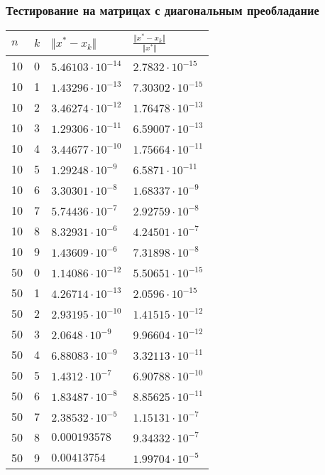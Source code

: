 \documentclass[english]{article}
\begin{document}
\subsubsection{Тестирование на матрицах с диагональным преобладание}
\begin{center}
  \begin{longtable}{l|l|l|l}
    \(n\) & \(k\) & \(\Vert x^* - x_k \Vert\) & \(\frac{\Vert x^* - x_k \Vert}{\Vert x^* \Vert}\) \\
    \hline
    10 & 0 & \(5.46103\cdot 10^{-14} \)& \(2.7832\cdot 10^{-15}\) \\
    10 & 1 & \(1.43296\cdot 10^{-13} \)& \(7.30302\cdot 10^{-15}\) \\
    10 & 2 & \(3.46274\cdot 10^{-12} \)& \(1.76478\cdot 10^{-13}\) \\
    10 & 3 & \(1.29306\cdot 10^{-11} \)& \(6.59007\cdot 10^{-13}\) \\
    10 & 4 & \(3.44677\cdot 10^{-10} \)& \(1.75664\cdot 10^{-11}\) \\
    10 & 5 & \(1.29248\cdot 10^{-9} \)& \(6.5871\cdot 10^{-11}\) \\
    10 & 6 & \(3.30301\cdot 10^{-8} \)& \(1.68337\cdot 10^{-9}\) \\
    10 & 7 & \(5.74436\cdot 10^{-7} \)& \(2.92759\cdot 10^{-8}\) \\
    10 & 8 & \(8.32931\cdot 10^{-6} \)& \(4.24501\cdot 10^{-7}\) \\
    10 & 9 & \(1.43609\cdot 10^{-6} \)& \(7.31898\cdot 10^{-8}\) \\
    \hline
    50 & 0 & \(1.14086\cdot 10^{-12} \)& \(5.50651\cdot 10^{-15}\) \\
    50 & 1 & \(4.26714\cdot 10^{-13} \)& \(2.0596\cdot 10^{-15}\) \\
    50 & 2 & \(2.93195\cdot 10^{-10} \)& \(1.41515\cdot 10^{-12}\) \\
    50 & 3 & \(2.0648\cdot 10^{-9}  \)& \(9.96604\cdot 10^{-12}\) \\
    50 & 4 & \(6.88083\cdot 10^{-9} \)& \(3.32113\cdot 10^{-11}\) \\
    50 & 5 & \(1.4312\cdot 10^{-7}  \)& \(6.90788\cdot 10^{-10}\) \\
    50 & 6 & \(1.83487\cdot 10^{-8} \)& \(8.85625\cdot 10^{-11}\) \\
    50 & 7 & \(2.38532\cdot 10^{-5} \)& \(1.15131\cdot 10^{-7}\) \\
    50 & 8 & \(0.000193578 \)& \(9.34332\cdot 10^{-7}\) \\
    50 & 9 & \(0.00413754  \)& \(1.99704\cdot 10^{-5}\) \\

\end{longtable}
\end{center}
\end{document}
